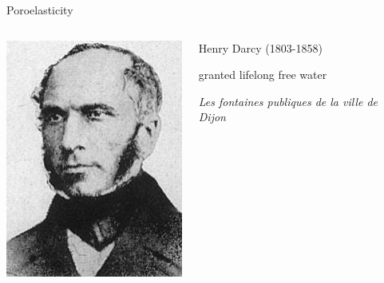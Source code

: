 \documentclass[xcolor=table]{beamer}
\begin{document}
\begin{frame}{Poroelasticity}
\begin{columns}
\includegraphics[width=\textwidth]{Henry_Darcy}
\begin{block}{Henry Darcy (1803-1858)}
\begin{description}[1803]
\item[1846] granted lifelong free water
\item[1856] \textit{Les fontaines publiques de la ville de Dijon}
\end{description}
\end{block}
\end{columns}


\end{frame}
\end{document}
